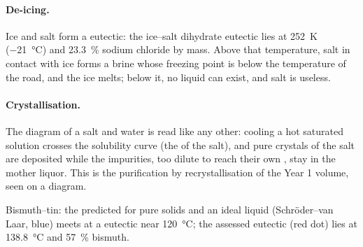 \paragraph{De-icing.} Ice and salt form a eutectic: the ice--salt dihydrate
eutectic lies at \qty{252}{K} (\qty{-21}{\degreeCelsius}) and 23.3~\% sodium
chloride by mass. Above that temperature, salt in contact with ice forms a
brine whose freezing point is below the temperature of the road, and the ice
melts; below it, no liquid can exist, and salt is useless.

\paragraph{Crystallisation.} The diagram of a salt and water is read like any
other: cooling a hot saturated solution crosses the solubility curve (the
 of the salt), and pure crystals of the salt are deposited while the
impurities, too dilute to reach their own , stay in the mother liquor.
This is the purification by recrystallisation of the Year 1 volume, seen on a
diagram.

\begin{omfigure}

{\small Bismuth--tin: the  predicted for pure solids and an ideal
liquid (Schröder--van Laar, blue) meets at a eutectic near
\qty{120}{\degreeCelsius}; the assessed eutectic (red dot) lies at
\qty{138.8}{\degreeCelsius} and 57~\% bismuth.}
\end{omfigure}


